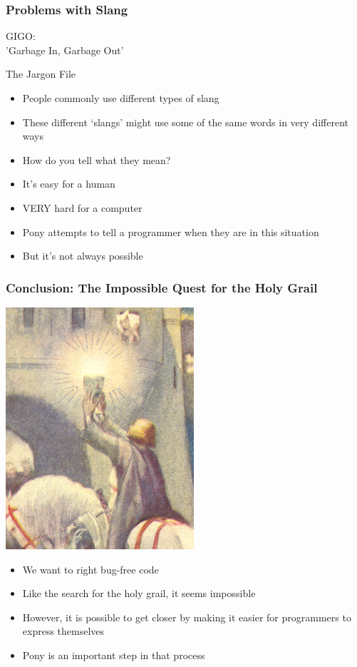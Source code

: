 \documentclass[bigger]{beamer}
\begin{document}
\begin{frame}
\frametitle{Problems with Slang}
\label{sec-7}


\epigraph{GIGO:\\ 'Garbage In, Garbage Out'}{The Jargon File}


\begin{itemize}
\item People commonly use different types of slang
\item These different `slangs' might use some of the same words in very different ways
\item How do you tell what they mean?
\end{itemize}
\pause

\begin{itemize}
\item It's easy for a human
\item VERY hard for a computer
\end{itemize}
\pause

\begin{itemize}
\item Pony attempts to tell a programmer when they are in this situation
\end{itemize}
\pause

\begin{itemize}
\item But it's not always possible
\end{itemize}
\end{frame}
\begin{frame}
\frametitle{Conclusion: The Impossible Quest for the Holy Grail}
\label{sec-8}


\includegraphics[scale=0.5]{../pictures/holy_grail.jpg}


\begin{itemize}
\item We want to right bug-free code
\item Like the search for the holy grail, it seems impossible
\item However, it is possible to get closer by making it easier for programmers to express themselves
\item Pony is an important step in that process
\end{itemize}
\end{frame}
\end{document}
